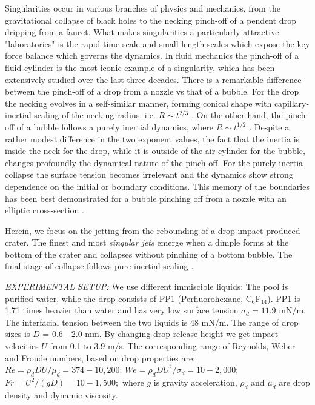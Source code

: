 \documentclass[10pt, a4paper]{article}
\begin{document}
Singularities occur in various branches of physics and mechanics, from the gravitational collapse of black holes to the necking pinch-off of a pendent drop dripping from a faucet.  
What makes singularities a particularly attractive "laboratories" is the rapid time-scale and small length-scales
which expose the key force balance which governs the dynamics.
In fluid mechanics the pinch-off of a fluid cylinder is the most iconic example of a singularity,
which has been extensively studied over the last three decades.
There is a remarkable difference between the pinch-off of a drop from a nozzle vs that of a bubble.
For the drop the necking evolves in a self-similar manner, 
forming conical shape with capillary-inertial scaling of the necking radius, i.e. $R \sim t^{2/3}$  \cite{Ref1}.  
On the other hand, the pinch-off of a bubble follows a purely inertial dynamics, where $R \sim t^{1/2}$ \cite{Ref2,Ref3,Ref4}.
Despite a rather modest difference in the two exponent values, 
the fact that the inertia is inside the neck for the drop, while it is outside of the air-cylinder for the bubble,
changes profoundly the dynamical nature of the pinch-off.
For the purely inertia collapse the surface tension becomes irrelevant and the dynamics show strong dependence on the initial or boundary conditions.  This memory of the boundaries has been best demonstrated for a bubble pinching off from a nozzle with an elliptic cross-section \cite{Ref5,Ref6}.  

Herein, we focus on the jetting from the rebounding of a drop-impact-produced crater.  
The finest and most {\it singular jets} emerge when a dimple forms at the bottom of the crater
and collapses without pinching of a bottom bubble.
The final stage of collapse follows pure inertial scaling \cite{Ref7}.


{\it EXPERIMENTAL SETUP:} 
We use different immiscible liquids: The pool is purified water, while the drop consists of PP1 (Perfluorohexane, C$_6$F$_{14}$).  PP1 is 1.71 times heavier than water and has very low surface tension $\sigma_d = 11.9$ mN/m.  The interfacial tension between the two liquids is 48 mN/m.
The range of drop sizes is $D$ = 0.6 - 2.0 mm.
By changing drop release-height we get impact velocities $U$ from 0.1 to 3.9 m/s.
The corresponding range of Reynolds, Weber and Froude numbers, based on drop properties are: 
$Re = \rho_d DU/\mu_d = 374 - 10,200$;
$We = \rho_d DU^2 /\sigma_d  = 10 - 2,000$; $Fr = U^2/(gD) = 10 - 1,500;$
where $g$ is gravity acceleration, $\rho_d$ and $\mu_d$ are drop density and dynamic viscosity.
\end{document}
